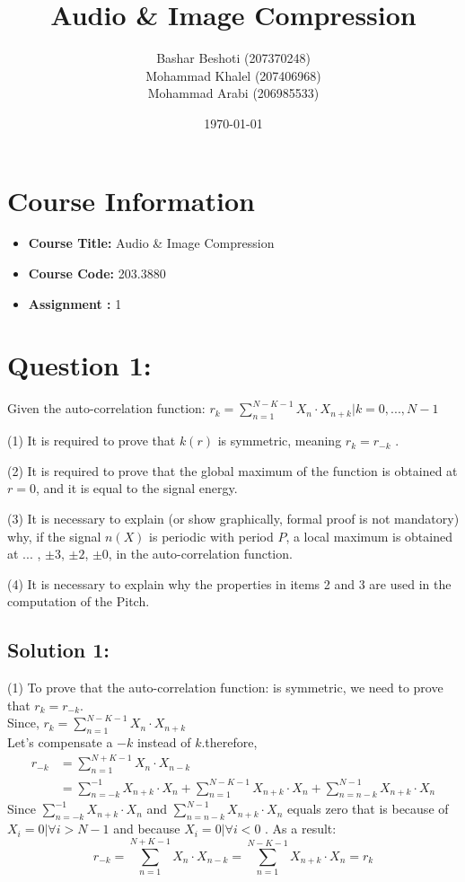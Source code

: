 \documentclass[letterpaper, 12pt]{article}
\title{Audio \& Image Compression}
\author{
    \begin{tabular}{c}
        Bashar Beshoti (207370248) \\
        Mohammad Khalel (207406968) \\
        Mohammad Arabi (206985533)
    \end{tabular}
}
\date{\today}
\begin{document}
\maketitle

\section*{Course Information}
\begin{itemize}
    \item \textbf{Course Title:} Audio \& Image Compression  %
    \item \textbf{Course Code:} 203.3880
    \item \textbf{Assignment :} 1
\end{itemize}

\newpage

\section*{Question 1:}
Given the auto-correlation function:
$r_k = \sum_{n=1}^{N-K-1} X_n \cdot X_{n+k} | k = 0 , ... , N-1$ 

(1) It is required to prove that \(k(r)\) is symmetric, meaning $r_{k} = r_{-k}$ .

(2) It is required to prove that the global maximum of the function is obtained at \(r = 0\), and it is equal to the signal energy.

(3) It is necessary to explain (or show graphically, formal proof is not mandatory) why, if the signal \(n(X)\) is periodic with period \(P\), a local maximum is obtained at ... , $\pm3$, $\pm2$, $\pm0$, in the auto-correlation function.

(4) It is necessary to explain why the properties in items 2 and 3 are used in the computation of the Pitch.


\subsection*{Solution 1:}

(1) To prove that the auto-correlation function: is symmetric, we need to prove that $r_{k} = r_{-k}$. \\
Since, $r_k = \sum_{n=1}^{N-K-1} X_n \cdot X_{n+k}$ \\

Let's compensate a $-k$ instead of $k$.therefore,
\begin{align*}
r_{-k} &= \sum_{n=1}^{N+K-1} X_n \cdot X_{n-k} \\
&= \sum_{n=-k}^{-1} X_{n+k} \cdot X_{n} + \sum_{n=1}^{N-K-1} X_{n+k} \cdot X_{n} + \sum_{n=n-k}^{N-1} X_{n+k} \cdot X_{n}
\end{align*}
Since $\sum_{n=-k}^{-1} X_{n+k} \cdot X_{n}$  and $\sum_{n=n-k}^{N-1} X_{n+k} \cdot X_{n}$ equals zero that is because of $X_i = 0 | \forall i > N-1$  and because $X_i = 0 | \forall i < 0$ . As a result: 
\[r_{-k} = \sum_{n=1}^{N+K-1} X_n \cdot X_{n-k} = \sum_{n=1}^{N-K-1} X_{n+k} \cdot X_{n} = r_k \]    
\end{document}
